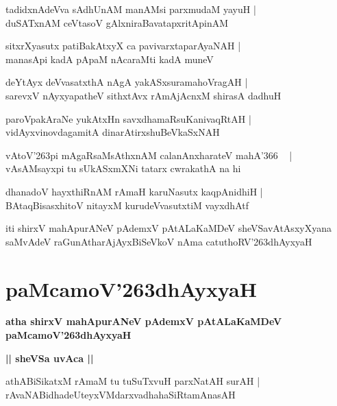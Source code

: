 \documentclass[twoside,12pt,openright]{book}
\def\S{\char'263}
\newcounter{shloka}[chapter]
\def\uvaca#1{\centerline{{\large\textbf{#1}}}}
\begin{document}
\begin{shloka}%
tadidxnAdeVva sAdhUnAM manAMsi parxmudaM yayuH |\\
duSATxnAM ceVtasoV gAlxniraBavatapxritApinAM 
\end{shloka}

\begin{shloka}%
sitxrXyasutx patiBakAtxyX ca pavivarxtaparAyaNAH |\\
manasApi kadA pApaM nAcaraMti kadA muneV 
\end{shloka}

\begin{shloka}%
deYtAyx deVvasatxthA nAgA yakASxsuramahoVragAH |\\
sarevxV nAyxyapatheV sithxtAvx rAmAjAcnxM  shirasA dadhuH
\end{shloka}

\begin{shloka}%
paroVpakAraNe yukAtxHn savxdhamaRsuKanivaqRtAH |\\
vidAyxvinovdagamitA dinarAtirxshuBeVkaSxNAH 
\end{shloka}

\begin{shloka}%
vAtoV\S pi mAgaRsaMsAthxnAM calanAnxharateV mahA\char'366 ~ |\\
vAsAMsayxpi tu sUkASxmXNi tatarx cwrakathA na hi 
\end{shloka}

\begin{shloka}%
dhanadoV hayxthiRnAM rAmaH karuNasutx kaqpAnidhiH |\\
BAtaqBisasxhitoV nitayxM kurudeVvasutxtiM vayxdhAtf 
\end{shloka}


\begin{center}
iti shirxV mahApurANeV pAdemxV pAtALaKaMDeV sheVSavAtAsxyXyana saMvAdeV 
raGunAtharAjAyxBiSeVkoV nAma catuthoRV\S dhAyxyaH
\end{center}

\chapter{paMcamoV\S dhAyxyaH}

\begin{center}
{\LARGE\bfseries atha shirxV mahApurANeV pAdemxV pAtALaKaMDeV paMcamoV\S dhAyxyaH}
\end{center}

\uvaca{|| sheVSa uvAca ||}

\begin{shloka}%
athABiSikatxM rAmaM tu tuSuTxvuH parxNatAH surAH |\\
rAvaNABidhadeUteyxVMdarxvadhahaSiRtamAnasAH 
\end{shloka}
\end{document}
